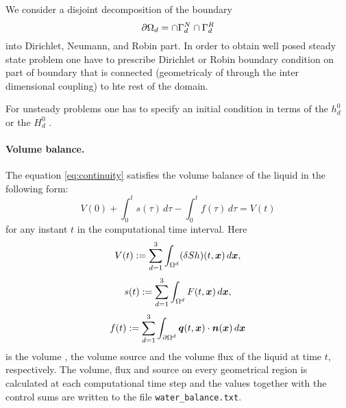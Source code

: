 We consider a disjoint decomposition of the boundary
\[
    \partial\Omega_d =  \cap \Gamma_d^N \cap \Gamma_d^R
\]
into Dirichlet, Neumann, and Robin part. In order to obtain well posed steady state problem one have to 
prescribe Dirichlet or Robin boundary condition on part of boundary that is connected (geometricaly of through
the inter dimensional coupling) to hte rest of the domain.

For unsteady problems one has to specify an initial condition in terms of the 
$h_d^0$ 
or the 
$H_d^0$ .

\paragraph{Volume balance.}
The equation \eqref{eq:continuity} satisfies the volume balance of the liquid in the following form:
\[ V(0) + \int_0^t s(\tau) \,d\tau - \int_0^t f(\tau) \,d\tau = V(t) \]
for any instant $t$ in the computational time interval.
Here
$$ V(t) := \sum_{d=1}^3\int_{\Omega^d}(\delta S h)(t,\mathbf{\boldsymbol{x}})\,d\mathbf{\boldsymbol{x}}, $$
$$ s(t) := \sum_{d=1}^3\int_{\Omega^d}F(t,\mathbf{\boldsymbol{x}})\,d\mathbf{\boldsymbol{x}}, $$
$$ f(t) := \sum_{d=1}^3\int_{\partial\Omega^d}\mathbf{\boldsymbol{q}}(t,\mathbf{\boldsymbol{x}})\cdot\mathbf{\boldsymbol{n}}(\mathbf{\boldsymbol{x}}) \,d\mathbf{\boldsymbol{x}} $$
is the volume , the volume source  and the volume flux  of the liquid at time $t$, respectively.
The volume, flux and source on every geometrical region is calculated at each computational time step and the values together with the control sums are written to the file \texttt{water\_balance.txt}.




